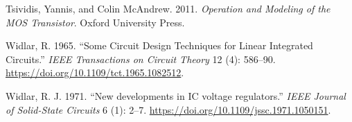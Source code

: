 \documentclass[
  a4paper,
  DIV=11,
  numbers=noendperiod]{scrartcl}
\newlength{\cslhangindent}
\newenvironment{CSLReferences}[2] %
 {\begin{list}{}{%
  \setlength{\itemindent}{0pt}
  \setlength{\leftmargin}{0pt}
  \setlength{\parsep}{0pt}
  \ifodd #1
   \setlength{\leftmargin}{\cslhangindent}
   \setlength{\itemindent}{-1\cslhangindent}
  \fi
  \setlength{\itemsep}{#2\baselineskip}}}
 {\end{list}}
\begin{document}
\begin{CSLReferences}{1}{0}
Tsividis, Yannis, and Colin McAndrew. 2011. \emph{Operation and Modeling
of the MOS Transistor}. Oxford University Press.

Widlar, R. 1965. {``{Some Circuit Design Techniques for Linear
Integrated Circuits}.''} \emph{IEEE Transactions on Circuit Theory} 12
(4): 586--90. \url{https://doi.org/10.1109/tct.1965.1082512}.

Widlar, R. J. 1971. {``{New developments in IC voltage regulators}.''}
\emph{IEEE Journal of Solid-State Circuits} 6 (1): 2--7.
\url{https://doi.org/10.1109/jssc.1971.1050151}.

\end{CSLReferences}
\end{document}
